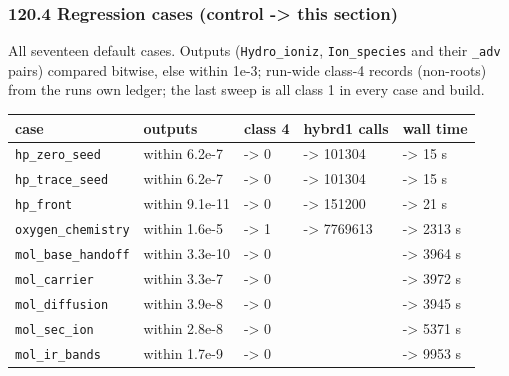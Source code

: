 \documentclass[english,a4paper]{my_memo}
\begin{document}
\subsubsection{120.4 Regression cases (control -\textgreater{} this section)}\label{1204-regression-cases-control---this-section}

All seventeen default cases. Outputs (\texttt{Hydro\_ioniz}, \texttt{Ion\_species} and their
\texttt{\_adv} pairs) compared bitwise, else within 1e-3; run-wide class-4 records
(non-roots) from the run\textquotesingle s own ledger; the last sweep is all class 1 in every
case and build.

{\def\LTcaptype{none} %
{\small
\begin{longtable}[]{@{}>{\raggedright\arraybackslash}p{\dimexpr(\linewidth-10\tabcolsep)/5\relax}>{\raggedright\arraybackslash}p{\dimexpr(\linewidth-10\tabcolsep)/5\relax}>{\raggedright\arraybackslash}p{\dimexpr(\linewidth-10\tabcolsep)/5\relax}>{\raggedright\arraybackslash}p{\dimexpr(\linewidth-10\tabcolsep)/5\relax}>{\raggedright\arraybackslash}p{\dimexpr(\linewidth-10\tabcolsep)/5\relax}@{}}
\toprule\noalign{}
case & outputs & class 4 & hybrd1 calls & wall time \\
\midrule\noalign{}
\endhead
\bottomrule\noalign{}
\endlastfoot
\texttt{hp\_zero\_seed} & within 6.2e-7 & 11992 -\textgreater{} 0 & 126814 -\textgreater{} 101304 & 14 -\textgreater{} 15 s \\
\texttt{hp\_trace\_seed} & within 6.2e-7 & 12192 -\textgreater{} 0 & 127722 -\textgreater{} 101304 & 14 -\textgreater{} 15 s \\
\texttt{hp\_front} & within 9.1e-11 & 228 -\textgreater{} 0 & 151656 -\textgreater{} 151200 & 18 -\textgreater{} 21 s \\
\texttt{oxygen\_chemistry} & within 1.6e-5 & 139 -\textgreater{} 1 & 7770715 -\textgreater{} 7769613 & 2221 -\textgreater{} 2313 s \\
\texttt{mol\_base\_handoff} & within 3.3e-10 & 24 -\textgreater{} 0 & & 3727 -\textgreater{} 3964 s \\
\texttt{mol\_carrier} & within 3.3e-7 & 1452 -\textgreater{} 0 & & 3740 -\textgreater{} 3972 s \\
\texttt{mol\_diffusion} & within 3.9e-8 & 24 -\textgreater{} 0 & & 3509 -\textgreater{} 3945 s \\
\texttt{mol\_sec\_ion} & within 2.8e-8 & 36 -\textgreater{} 0 & & 5329 -\textgreater{} 5371 s \\
\texttt{mol\_ir\_bands} & within 1.7e-9 & 0 -\textgreater{} 0 & & 8832 -\textgreater{} 9953 s \\

\end{longtable}}}
\end{document}
